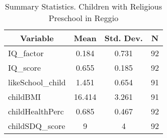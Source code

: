
\begin{table}[htbp]\centering \caption{Summary Statistics. Children with Religious Preschool in Reggio \label{bothChildmaternaReliReggio}}
\begin{tabular}{l c c  c}\hline\hline
\multicolumn{1}{c}{\textbf{Variable}} & \textbf{Mean}
 & \textbf{Std. Dev.} & \textbf{N}\\ \hline
IQ\_factor & 0.184 & 0.731  & 92\\
IQ\_score & 0.655 & 0.185  & 92\\
likeSchool\_child & 1.451 & 0.654  & 91\\
childBMI & 16.414 & 3.261  & 91\\
childHealthPerc & 0.685 & 0.467  & 92\\
childSDQ\_score & 9 & 4  & 92\\
\hline\end{tabular}
\end{table}
